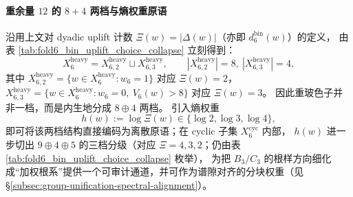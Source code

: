 \paragraph{重余量 $12$ 的 $8+4$ 两档与熵权重原语}
沿用上文对 dyadic uplift 计数 \(\Xi(w)=|\Delta(w)|\)（亦即 \(d^{\mathrm{bin}}_6(w)\)）的定义，
由表 \ref{tab:fold6_bin_uplift_choice_collapse} 立刻得到：
\[
X_6^{\mathrm{heavy}}=X_{6,2}^{\mathrm{heavy}}\sqcup X_{6,3}^{\mathrm{heavy}},
\qquad |X_{6,2}^{\mathrm{heavy}}|=8,\ |X_{6,3}^{\mathrm{heavy}}|=4,
\]
其中
\(
X_{6,2}^{\mathrm{heavy}}=\{w\in X_6^{\mathrm{heavy}}:w_6=1\}
\)
对应 \(\Xi(w)=2\)，
\(
X_{6,3}^{\mathrm{heavy}}=\{w\in X_6^{\mathrm{heavy}}:w_6=0,\ V_6(w)>8\}
\)
对应 \(\Xi(w)=3\)。
因此重玻色子并非一档，而是内生地分成 \(8\oplus 4\) 两档。
引入熵权重
\[
h(w):=\log \Xi(w)\in\{\log 2,\log 3,\log 4\},
\]
即可将该两档结构直接编码为离散原语；在 cyclic 子集 \(X_6^{\mathrm{cyc}}\) 内部，
\(h(w)\) 进一步切出 \(9\oplus 4\oplus 5\) 的三档分级（对应 \(\Xi=4,3,2\)；仍由表 \ref{tab:fold6_bin_uplift_choice_collapse} 枚举），
为把 \(B_3/C_3\) 的根样方向细化成“加权根系”提供一个可审计通道，并可作为谱隙对齐的分块权重（见 \S\ref{subsec:group-unification-spectral-alignment}）。

